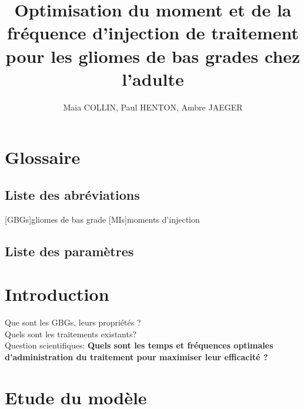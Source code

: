 \documentclass[12pt,a4paper]{article}
\title{Optimisation du moment et de la fréquence d'injection de traitement pour les gliomes de bas grades chez l'adulte} %
\author{Maia COLLIN, Paul HENTON, Ambre JAEGER} %
\begin{document}
\maketitle %

\section{Glossaire}
\subsection{Liste des abréviations}
\begin{acronym}
[GBGs]{gliomes de bas grade}%
[MIs]{moments d'injection}
\end{acronym}
\subsection{Liste des paramètres}


\section{Introduction}
Que sont les \acp{GBG}, leurs propriétés ?\\
Quels sont les traitements existants?\\
Question scientifiques: \textbf{Quels sont les temps et fréquences optimales d'administration du traitement pour maximiser leur efficacité ?}


\section{Etude du modèle}
\end{document}
